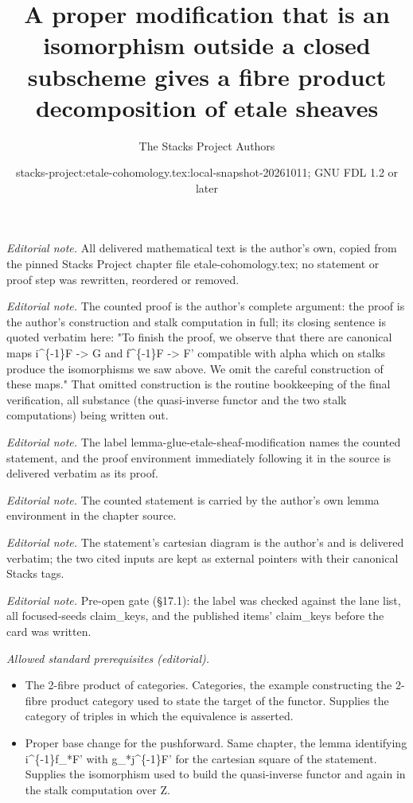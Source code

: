 \documentclass[10pt,a4paper]{amsart}
\title{A proper modification that is an isomorphism outside a closed subscheme gives a fibre product decomposition of etale sheaves}
\author{The Stacks Project Authors}
\date{stacks-project:etale-cohomology.tex:local-snapshot-20261011; GNU FDL 1.2 or later}
\theoremstyle{plain}
\theoremstyle{definition}
\theoremstyle{remark}
\numberwithin{equation}{subsection}
\begin{document}
\maketitle
\noindent\textit{Editorial note.} All delivered mathematical text is the author's own, copied from the pinned Stacks Project chapter file etale-cohomology.tex; no statement or proof step was rewritten, reordered or removed.\par\medskip
\noindent\textit{Editorial note.} The counted proof is the author's complete argument: the proof is the author's construction and stalk computation in full; its closing sentence is quoted verbatim here: "To finish the proof, we observe that there are canonical maps i\textasciicircum{}\{-1\}F -> G and f\textasciicircum{}\{-1\}F -> F' compatible with alpha which on stalks produce the isomorphisms we saw above. We omit the careful construction of these maps." That omitted construction is the routine bookkeeping of the final verification, all substance (the quasi-inverse functor and the two stalk computations) being written out.\par\medskip
\noindent\textit{Editorial note.} The label lemma-glue-etale-sheaf-modification names the counted statement, and the proof environment immediately following it in the source is delivered verbatim as its proof.\par\medskip
\noindent\textit{Editorial note.} The counted statement is carried by the author's own lemma environment in the chapter source.\par\medskip
\noindent\textit{Editorial note.} The statement's cartesian diagram is the author's and is delivered verbatim; the two cited inputs are kept as external pointers with their canonical Stacks tags.\par\medskip
\noindent\textit{Editorial note.} Pre-open gate (§17.1): the label was checked against the lane list, all focused-seeds claim\_keys, and the published items' claim\_keys before the card was written.\par\medskip
\noindent\textit{Allowed standard prerequisites (editorial).}\begin{itemize}
\item The 2-fibre product of categories. Categories, the example constructing the 2-fibre product category used to state the target of the functor. Supplies the category of triples in which the equivalence is asserted.
\item Proper base change for the pushforward. Same chapter, the lemma identifying i\textasciicircum{}\{-1\}f\_*F' with g\_*j\textasciicircum{}\{-1\}F' for the cartesian square of the statement. Supplies the isomorphism used to build the quasi-inverse functor and again in the stalk computation over Z.
\end{itemize}\medskip
\end{document}
